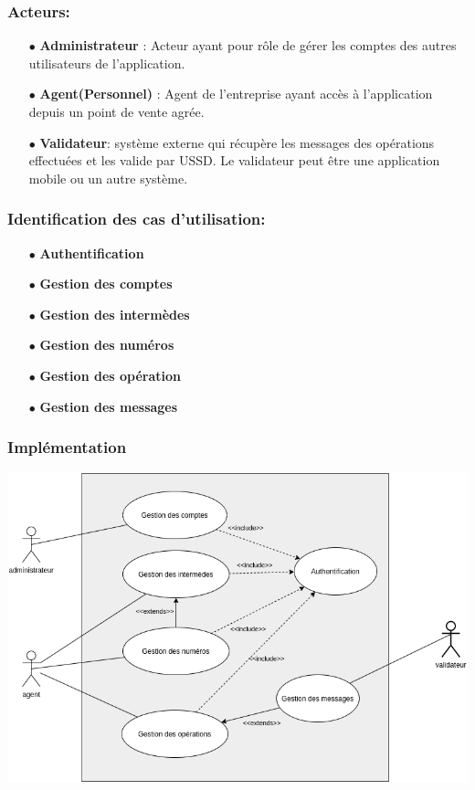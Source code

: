 		\subsubsection{Acteurs:}
			\begin{itemize}
				\item[$\bullet$] \textbf{Administrateur} : Acteur ayant pour rôle de gérer les comptes des autres utilisateurs de l'application.\\
				\item[$\bullet$]  \textbf{Agent(Personnel)} : Agent de l'entreprise ayant accès à l'application depuis un point de vente agrée.\\
				\item[$\bullet$] \textbf{Validateur}: système externe qui récupère les messages des opérations effectuées et les valide par USSD. Le validateur peut être une application mobile ou un autre système.\\
			\end{itemize}
		\subsubsection{Identification des cas d’utilisation:}
			\begin{itemize}
				\item[$\bullet$]  \textbf{Authentification}
				\item[$\bullet$] \textbf{Gestion des comptes}
				\item[$\bullet$] \textbf{Gestion des intermèdes}
				\item[$\bullet$] \textbf{Gestion des numéros}
				\item[$\bullet$] \textbf{Gestion des opération}
				\item[$\bullet$] \textbf{Gestion des messages}
			\end{itemize}
		\subsubsection{Implémentation}
			\begin{center}
				\includegraphics[width=16cm]{chap_2/use-case.png}
				\label{figure9}
			\end{center}
